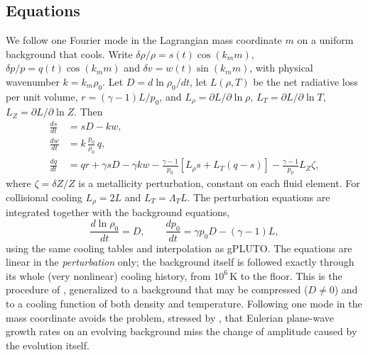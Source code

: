 \documentclass[11pt]{article}
\newcommand{\LT}{\Lambda_T}
\newcommand{\drho}{\delta\rho/\rho}
\begin{document}
\subsection{Equations}
We follow one Fourier mode in the Lagrangian mass coordinate $m$ on a uniform
background that cools. Write
$\drho = s(t)\cos(k_m m)$, $\delta p/p = q(t)\cos(k_m m)$ and
$\delta v = w(t)\sin(k_m m)$, with physical wavenumber $k=k_m\rho_0$. Let
$D=d\ln\rho_0/dt$, let $L(\rho,T)$ be the net radiative loss per unit volume,
$r=(\gamma-1)L/p_0$, and $L_\rho=\partial L/\partial\ln\rho$,
$L_T=\partial L/\partial\ln T$, $L_Z=\partial L/\partial\ln Z$. Then
\begin{align}
\frac{ds}{dt} &= sD - kw, \label{eq:s}\\
\frac{dw}{dt} &= k\,\frac{p_0}{\rho_0}\,q, \label{eq:w}\\
\frac{dq}{dt} &= qr + \gamma sD - \gamma kw
  - \frac{\gamma-1}{p_0}\left[L_\rho s + L_T(q-s)\right]
  - \frac{\gamma-1}{p_0}L_Z\zeta, \label{eq:q}
\end{align}
where $\zeta=\delta Z/Z$ is a metallicity perturbation, constant on each fluid
element. For collisional cooling $L_\rho=2L$ and $L_T=\LT L$. The perturbation
equations are integrated together with the background equations,
\begin{equation}
\frac{d\ln\rho_0}{dt}=D,\qquad \frac{dp_0}{dt}=\gamma p_0D-(\gamma-1)L,
\label{eq:bg}
\end{equation}
using the same cooling tables and interpolation as gPLUTO. The equations are
linear in the \emph{perturbation} only; the background itself is followed
exactly through its whole (very nonlinear) cooling history, from $10^6$\,K to
the floor. This is the procedure of \citet{schwarz72}, generalized to a
background that may be compressed ($D\neq0$) and to a cooling function of both
density and temperature. Following one mode in the mass coordinate avoids the
problem, stressed by \citet{balbus89}, that Eulerian plane-wave growth rates on an
evolving background miss the change of amplitude caused by the evolution
itself.
\end{document}
